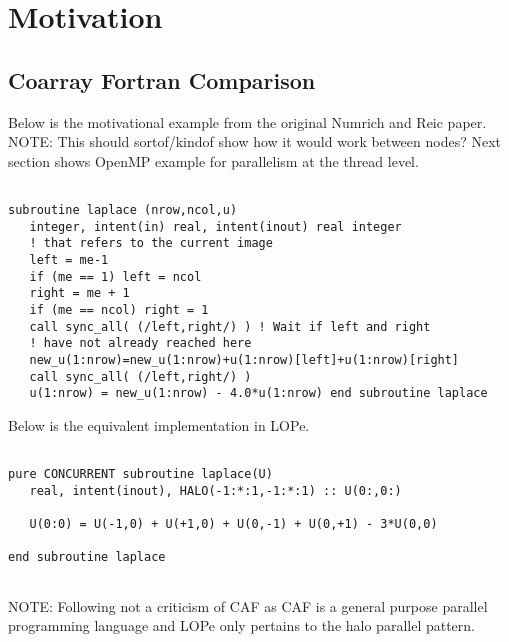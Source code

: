 \section{Motivation}

\subsection{Coarray Fortran Comparison}

Below is the motivational example from the original Numrich and Reic paper.
{NOTE: This should sortof/kindof show how it would work between nodes?  Next
section shows OpenMP example for parallelism at the thread level.}

{\small
\begin{verbatim}

subroutine laplace (nrow,ncol,u)
   integer, intent(in) real, intent(inout) real integer
   ! that refers to the current image
   left = me-1
   if (me == 1) left = ncol
   right = me + 1
   if (me == ncol) right = 1
   call sync_all( (/left,right/) ) ! Wait if left and right
   ! have not already reached here
   new_u(1:nrow)=new_u(1:nrow)+u(1:nrow)[left]+u(1:nrow)[right]
   call sync_all( (/left,right/) )
   u(1:nrow) = new_u(1:nrow) - 4.0*u(1:nrow) end subroutine laplace

\end{verbatim}
}


Below is the equivalent implementation in LOPe.


{\small
\begin{verbatim}

pure CONCURRENT subroutine laplace(U)
   real, intent(inout), HALO(-1:*:1,-1:*:1) :: U(0:,0:)

   U(0:0) = U(-1,0) + U(+1,0) + U(0,-1) + U(0,+1) - 3*U(0,0)

end subroutine laplace


\end{verbatim}
}

NOTE: Following not a criticism of CAF as CAF is a general purpose parallel
programming language and LOPe only pertains to the halo parallel pattern.

